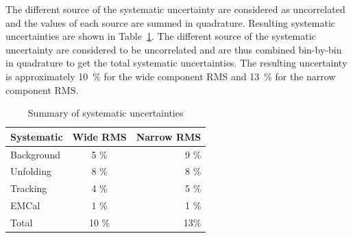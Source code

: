 The different source of the systematic uncertainty are considered as uncorrelated and the values of each source are summed in quadrature. Resulting systematic uncertainties are shown in Table~\ref{tab:systematics}. The different source of the systematic uncertainty are considered to be uncorrelated and are thus combined bin-by-bin in quadrature to get the total systematic uncertainties.  The resulting uncertainty is approximately 10~\% for the wide component RMS and 13~\% for the narrow component RMS. 

\begin{table}[htb]
\centering
\caption{Summary of systematic uncertainties}
\label{tab:systematics}
\begin{tabular}{ l | c | r }
  Systematic & Wide RMS & Narrow RMS \\
    \hline			
  Background & 5 \% & 9 \% \\
  Unfolding & 8 \% & 8 \% \\
  Tracking & 4 \% & 5 \% \\ 
  EMCal & 1 \% & 1 \% \\
  Total & 10 \% & 13\% \\
  \hline
  \end{tabular}
  \end{table}


